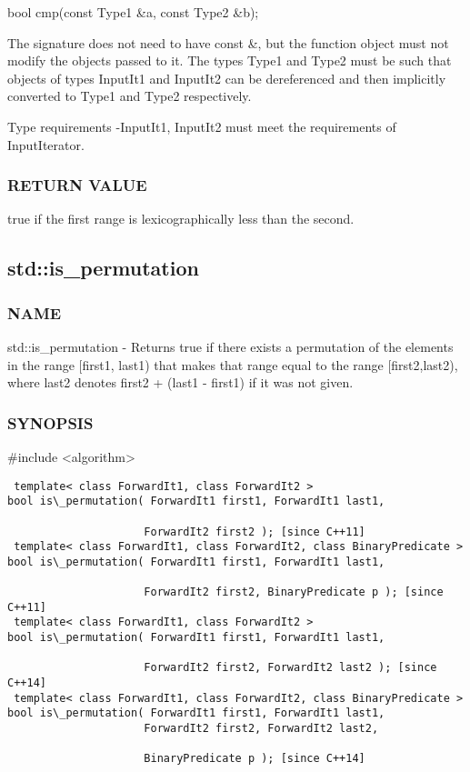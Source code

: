  bool cmp(const Type1 \&a, const Type2 \&b);

The signature does not need to have const \&, but the function object must not modify the objects passed to it.
The types Type1 and Type2 must be such that objects of types InputIt1 and InputIt2 can be dereferenced and then implicitly converted to Type1 and Type2 respectively.

 Type requirements
 -InputIt1, InputIt2 must meet the requirements of InputIterator.

\subsubsection{RETURN VALUE}
true if the first range is lexicographically less than the second.



\subsection{std::is\_permutation}

\subsubsection{NAME}
std::is\_permutation - Returns true if there exists a permutation of the elements in the range [first1, last1) that makes that range equal to the range [first2,last2), where last2 denotes first2 + (last1 - first1) if it was not given.

\subsubsection{SYNOPSIS}
\#include <algorithm>

\begin{lstlisting}
 template< class ForwardIt1, class ForwardIt2 >
bool is\_permutation( ForwardIt1 first1, ForwardIt1 last1,

                     ForwardIt2 first2 ); [since C++11]
 template< class ForwardIt1, class ForwardIt2, class BinaryPredicate >
bool is\_permutation( ForwardIt1 first1, ForwardIt1 last1,

                     ForwardIt2 first2, BinaryPredicate p ); [since C++11]
 template< class ForwardIt1, class ForwardIt2 >
bool is\_permutation( ForwardIt1 first1, ForwardIt1 last1,

                     ForwardIt2 first2, ForwardIt2 last2 ); [since C++14]
 template< class ForwardIt1, class ForwardIt2, class BinaryPredicate >
bool is\_permutation( ForwardIt1 first1, ForwardIt1 last1,
                     ForwardIt2 first2, ForwardIt2 last2,

                     BinaryPredicate p ); [since C++14]
\end{lstlisting}

